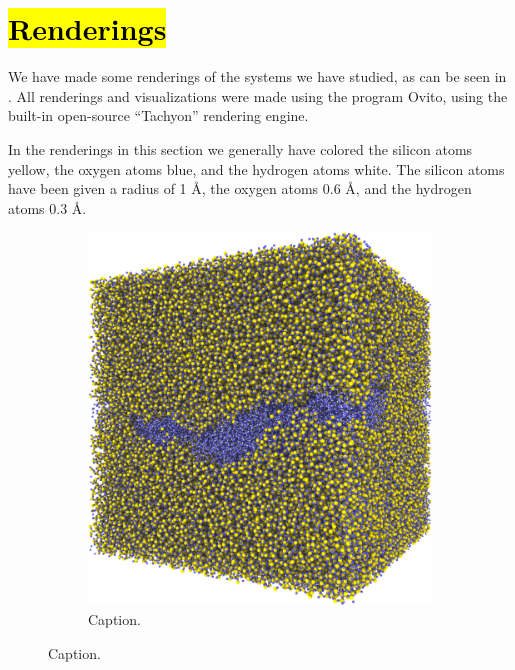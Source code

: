 \FloatBarrier
\section[Renderings]{\hl{Renderings}}
We have made some renderings of the systems we have studied, as can be seen in . All renderings and visualizations were made using the program Ovito\cite{stukowski2010ovito}, using the built-in open-source ``Tachyon'' rendering engine.

In the renderings in this section we generally have colored the silicon atoms yellow, the oxygen atoms blue, and the hydrogen atoms white. The silicon atoms have been given a radius of 1 \AA, the oxygen atoms 0.6 \AA, and the hydrogen atoms 0.3 \AA.
%
\begin{figure}[htpb]%
    \centering%
    \setlength{\myfigwidth}{0.49\textwidth}%
%
    \begin{subfigure}[b]{\myfigwidth}%
        \centering%
        \includegraphics[width=\textwidth]{images/systems/trimmed-rough_fracture01_abel_13}%
        \caption{Caption.}%

\end{subfigure}
\end{figure}
